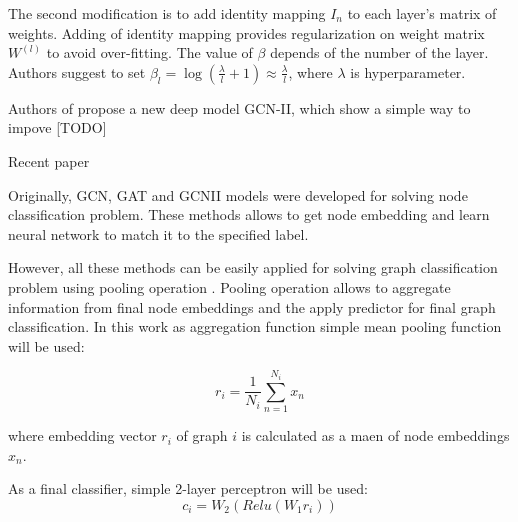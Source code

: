 The second modification is to add identity mapping $I_n$ to each layer's matrix of weights.
Adding of identity mapping provides regularization on weight matrix $W^(l)$ to avoid over-fitting.
The value of $\beta$ depends of the number of the layer. Authors suggest to set $\beta_l = \log(\frac{\lambda}{l}+1) \approx \frac{\lambda}{l}$,
where $\lambda$ is hyperparameter. 


Authors of \cite{GCNII} propose a new deep model GCN-II, which show a simple way to impove [TODO]

Recent paper \cite{GCNII}





Originally, GCN, GAT and GCNII models were developed for solving node classification problem.
These methods allows to get node embedding and learn neural network to match it to the specified label.

However, all these methods can be easily applied for solving graph classification problem using pooling operation \cite{distillGCN}.
Pooling operation allows to aggregate information from final node embeddings and the apply predictor for final graph classification.
In this work as aggregation function simple mean pooling function will be used:

\begin{equation}
    r_i = \frac{1}{N_i}\sum_{n=1}^{N_i}x_n
    \label{eq:mean_pool}
\end{equation}

where embedding vector $r_i$ of graph $i$ is calculated as a maen of node embeddings $x_n$.

As a final classifier, simple 2-layer perceptron will be used:
\begin{equation}
    c_i = W_2(Relu(W_1r_i))
    \label{eq:final_classifier}
\end{equation}




